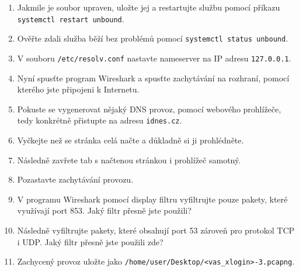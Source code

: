 \begin{enumerate}
    \item Jakmile je soubor upraven, uložte jej a restartujte službu pomocí příkazu \texttt{systemctl restart unbound}.
    \item Ověřte zdali služba běží bez problémů pomocí \texttt{systemctl status unbound}.
    \item V souboru \texttt{/etc/resolv.conf} nastavte nameserver na IP adresu \texttt{127.0.0.1}.
    \item Nyní spusťte program Wireshark a spusťte zachytávání na rozhraní, pomocí kterého jste připojeni k Internetu.
    \item Pokuste se vygenerovat nějaký DNS provoz, pomocí webového prohlížeče, tedy konkrétně přistupte na adresu \texttt{idnes.cz}.
    \item Vyčkejte než se stránka celá načte a důkladně si ji prohlédněte.
    \item Následně zavřete tab s načtenou stránkou i prohlížeč samotný.
    \item Pozastavte zachytávání provozu.
    \item V programu Wireshark pomocí display filtru vyfiltrujte pouze pakety, které využívají port 853. Jaký filtr přesně jste použili?
    \item Následně vyfiltrujte pakety, které obsahují port 53 zároveň pro protokol TCP i UDP. Jaký filtr přesně jste použili zde?
    \item Zachycený provoz uložte jako \texttt{/home/user/Desktop/<vas\_xlogin>-3.pcapng}.
\end{enumerate}


